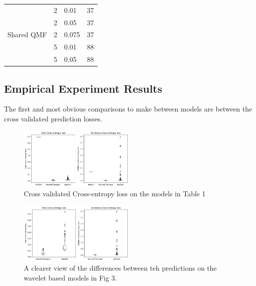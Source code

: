 \documentclass[9pt,conference]{IEEEtran}
\begin{document}
\begin{center}
\begin{tabular}{ |p{3cm}||p{3cm}|p{3cm}|p{3cm}|  }
        \multirow{5}{4em}{Shared QMF}  
                                        & 2 &  0.01 & 37\\
                                        & 2 &  0.05 & 37\\
                                        & 2 &  0.075 & 37\\
                                        & 5 & 0.01 & 88 \\
                                        & 5 & 0.05 & 88 \\                          
                                     
        \hline
    
    \end{tabular}
\end{center}


\subsection{Empirical Experiment Results}

The first and most obvious comparisons to make between models are between the cross validated prediction losses.

\begin{figure}[H]
    \centering
    \includegraphics[width=0.5\textwidth]{full_loss.png}
    \caption{Cross validated Cross-entropy loss on the models in Table 1}
\end{figure}

\begin{figure}[H]
    \centering
    \includegraphics[width=0.5\textwidth]{full_wavelet_loss.png}
    \caption{A clearer view of the differences between teh predictions on the wavelet based models in Fig 3.}
\end{figure}
\end{document}
